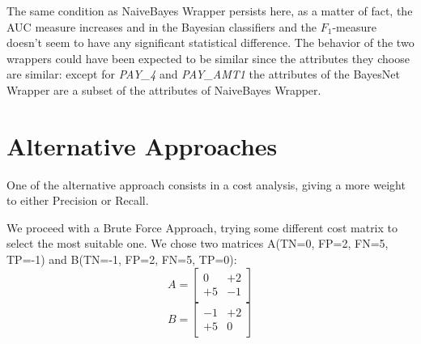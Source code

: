 \documentclass[fleqn,10pt]{SelfArx} %
\begin{document}
\begin{table}[h!]
	\caption{Evaluation using 3 Fold Cross Validation}
	\label{table:3fcvBN}
\end{table} 

The same condition as NaiveBayes Wrapper persists here, 
as a matter of fact, the AUC measure increases and in the Bayesian classifiers and the $F_1$-measure doesn't seem to have any significant statistical difference. \newline
The behavior of the two wrappers could have been expected to be similar since the attributes they choose are similar: except for \textit{PAY\_4} and \textit{PAY\_AMT1} the attributes of the BayesNet Wrapper are a subset of the attributes of NaiveBayes Wrapper.

\section{Alternative Approaches} %
One of the alternative approach consists in a cost analysis, giving a more weight to either Precision or Recall. 

We proceed with a Brute Force Approach, trying some different cost matrix to select the most suitable one. \newline
We chose two matrices A(TN=0, FP=2, FN=5, TP=-1) and B(TN=-1, FP=2, FN=5, TP=0):
$$
A=\begin{bmatrix} 
0 & +2 \\
+5 & -1 
\end{bmatrix}
$$
$$
B=\begin{bmatrix} 
-1 & +2 \\
+5 & 0 
\end{bmatrix}
$$ 
\end{document}
